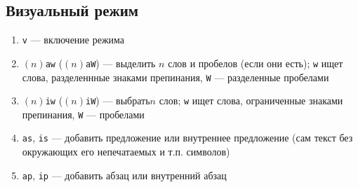 \documentclass[a4paper,10pt, twocolumn]{article}
\newcommand*{\cod}[1]{\texttt{#1}}
\begin{document}
\subsection{Визуальный режим}
\begin{enumerate}
    \item \cod{v} --- включение режима
    \item $(n)$\cod{aw} ($(n)$\cod{aW}) --- выделить $n$ слов и пробелов (если они есть); \cod{w} ищет слова, разделеннные знаками препинания, \cod{W} --- разделенные пробелами
    \item $(n)$\cod{iw} ($(n)$\cod{iW}) --- выбрать$n$ слов; \cod{w} ищет слова, ограниченные знаками препинания, \cod{W} --- пробелами
    \item \cod{as}, \cod{is} --- добавить предложение или внутреннее предложение (сам текст без окружающих его непечатаемых и т.п. символов)
    \item \cod{ap}, \cod{ip} --- добавить абзац или внутренний абзац
\end{enumerate}
\end{document}
